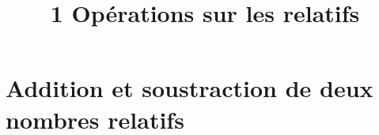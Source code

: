 \documentclass[12pt,a4paper]{article}
\date{}
\title{\textcircled{{\normalsize{1}}} Opérations sur les relatifs}
\begin{document}
	
	\maketitle



%
%
%
%
%
%
 
\section{Addition et soustraction de deux nombres relatifs}



\newpage

%
%
\end{document}
